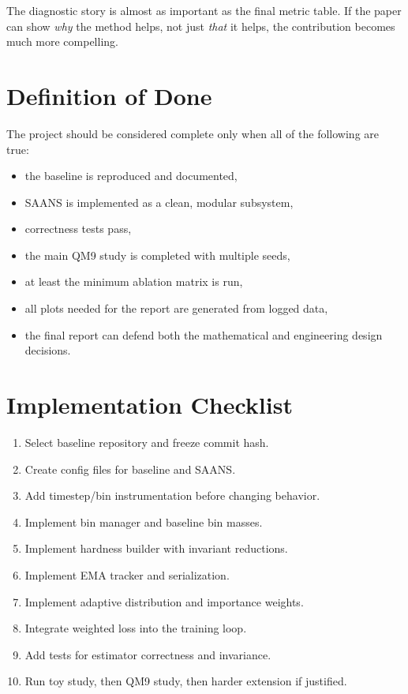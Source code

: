 \documentclass[11pt]{report}
\begin{document}
The diagnostic story is almost as important as the final metric table. If the paper can show \emph{why} the method helps, not just \emph{that} it helps, the contribution becomes much more compelling.

\chapter{Definition of Done}

The project should be considered complete only when all of the following are true:

\begin{itemize}[leftmargin=2em]
    \item the baseline is reproduced and documented,
    \item SAANS is implemented as a clean, modular subsystem,
    \item correctness tests pass,
    \item the main QM9 study is completed with multiple seeds,
    \item at least the minimum ablation matrix is run,
    \item all plots needed for the report are generated from logged data,
    \item the final report can defend both the mathematical and engineering design decisions.
\end{itemize}

\appendix

\chapter{Implementation Checklist}

\begin{enumerate}[leftmargin=2em]
    \item Select baseline repository and freeze commit hash.
    \item Create config files for baseline and SAANS.
    \item Add timestep/bin instrumentation before changing behavior.
    \item Implement bin manager and baseline bin masses.
    \item Implement hardness builder with invariant reductions.
    \item Implement EMA tracker and serialization.
    \item Implement adaptive distribution and importance weights.
    \item Integrate weighted loss into the training loop.
    \item Add tests for estimator correctness and invariance.
    \item Run toy study, then QM9 study, then harder extension if justified.
\end{enumerate}
\end{document}
